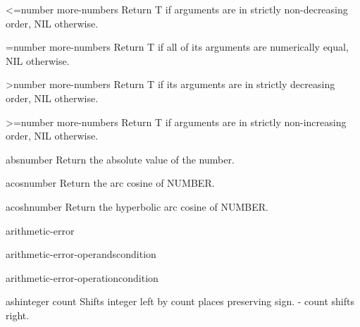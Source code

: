 \begin{function}{<=}{number \rest more-numbers}{}
  Return T if arguments are in strictly non-decreasing order, NIL otherwise.
\end{function}

\begin{function}{=}{number \rest more-numbers}{}
  Return T if all of its arguments are numerically equal, NIL otherwise.
\end{function}

\begin{function}{>}{number \rest more-numbers}{}
  Return T if its arguments are in strictly decreasing order, NIL otherwise.
\end{function}

\begin{function}{>=}{number \rest more-numbers}{}
  Return T if arguments are in strictly non-increasing order, NIL otherwise.
\end{function}

\begin{function}{abs}{number}{}
  Return the absolute value of the number.
\end{function}

\begin{function}{acos}{number}{}
  Return the arc cosine of NUMBER.
\end{function}

\begin{function}{acosh}{number}{}
  Return the hyperbolic arc cosine of NUMBER.
\end{function}

\begin{condition-type}{arithmetic-error}{}{}
  
\end{condition-type}

\begin{function}{arithmetic-error-operands}{condition}{}
  
\end{function}

\begin{function}{arithmetic-error-operation}{condition}{}
  
\end{function}

\begin{function}{ash}{integer count}{}
  Shifts integer left by count places preserving sign. - count shifts right.
\end{function}


